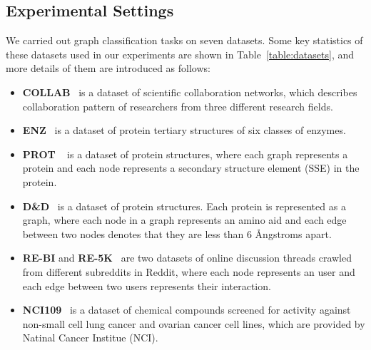 \documentclass[11pt,dvipdfm]{article}
\begin{document}
\subsection{Experimental Settings}
We carried out graph classification tasks on seven datasets. Some key statistics of these datasets used in our experiments are shown in Table~\ref{table:datasets}, and more details of them are introduced as follows:
\begin{itemize}
    \item \textbf{COLLAB}~\cite{yanardag2015deep} is a dataset of scientific collaboration networks, which describes collaboration pattern of researchers from three different research fields.

    \item \textbf{ENZ}~\cite{shervashidze2011weisfeiler} is a dataset of protein tertiary structures of six classes of enzymes. 
    \item \textbf{PROT} ~\cite{borgwardt2005protein} is a dataset of protein structures, where each graph represents a protein and each node represents a secondary structure element (SSE) in the protein.
    \item \textbf{D\&D}~\cite{dobson2003distinguishing} is a dataset of protein structures. Each protein is represented as a graph, where each node in a graph represents an amino aid and each edge between two nodes denotes that they are less than 6 {\AA}ngstroms apart. 
    \item \textbf{RE-BI} and \textbf{RE-5K}~\cite{yanardag2015deep} are two datasets of online discussion threads crawled from different subreddits in Reddit, where each node represents an user and each edge between two users represents their interaction.
    \item \textbf{NCI109}~\cite{shervashidze2011weisfeiler} is a dataset of chemical compounds screened for activity against non-small cell lung cancer and ovarian cancer cell lines, which are provided by Natinal Cancer Institue (NCI).

\end{itemize}
    
\end{document}
